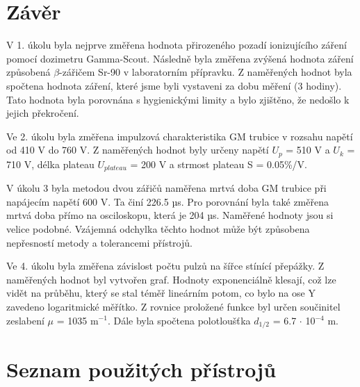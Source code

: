 \documentclass{protokol}
\begin{document}
\section{Závěr}
    V 1. úkolu byla nejprve změřena hodnota přirozeného pozadí ionizujícího záření pomocí dozimetru Gamma-Scout. Následně byla změřena zvýšená hodnota záření způsobená $\beta$-zářičem Sr-90 v laboratorním přípravku. Z naměřených hodnot byla spočtena hodnota záření, které jsme byli vystaveni za dobu měření (3 hodiny). Tato hodnota byla porovnána s hygienickými limity a bylo zjištěno, že nedošlo k jejich překročení.

    Ve 2. úkolu byla změřena impulzová charakteristika GM trubice v rozsahu napětí od 410 V do 760 V. Z naměřených hodnot byly určeny napětí $U_p$ = 510 V a $U_k$ = 710 V, délka plateau $U_{plateau}$ = 200 V a strmost plateau S = 0.05\%/V. 
    
    V úkolu 3 byla metodou dvou zářičů naměřena mrtvá doba GM trubice při napájecím napětí 600 V. Ta činí 226.5 µs. Pro porovnání byla také změřena mrtvá doba přímo na osciloskopu, která je 204 µs. Naměřené hodnoty jsou si velice podobné. Vzájemná odchylka těchto hodnot může být způsobena nepřesností metody a tolerancemi přístrojů.
    
    Ve 4. úkolu byla změřena závislost počtu pulzů na šířce stínící přepážky. Z naměřených hodnot byl vytvořen graf. Hodnoty exponenciálně klesají, což lze vidět na průběhu, který se stal téměř lineárním potom, co bylo na ose Y zavedeno logaritmické měřítko. Z rovnice proložené funkce byl určen součinitel zeslabení $\mu$ = 1035 m$^{-1}$. Dále byla spočtena polotloušťka $d_{1/2}$ = 6.7 $\cdot$ 10$^{-4}$ m.
    \cite{navod}

\pagebreak


\section{Seznam použitých přístrojů}

\pagebreak


\end{document}
